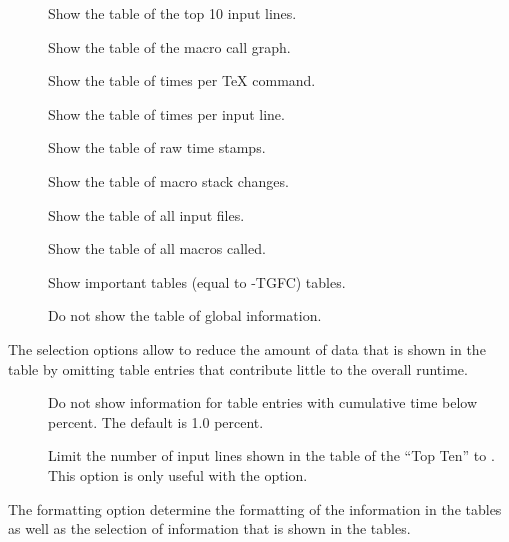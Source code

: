 \documentclass[a4paper,english]{article}
\begin{document}
\begin{description}
\item[]
  Show the table of the top 10 input lines.
\item[]
  Show the table of the  macro call graph.
\item[]    Show the table of times per TeX command.
\item[]    Show the table of times per input line.
\item[]    Show the table of raw time stamps.
\item[]    Show the table of macro stack changes.
\item[]    Show the table of all input files.
\item[]    Show the table of all macros called.
\item[]    Show important tables (equal to -TGFC) tables.
\item[]    Do not show the table of global information.
\end{description}

The selection options allow to reduce the amount of data that is shown
in the table by omitting table entries that contribute little to the
overall runtime.

\begin{description}
\item[] Do not show information for table entries
  with cumulative time below  percent. The default is 1.0 percent.
\item[] Limit the number of input lines shown in the
  table of the ``Top Ten'' to . This option is only useful
  with the  option.
\end{description}

The formatting option determine the formatting of the information in the tables
as well as the selection of information that is shown in the tables.
\end{document}
